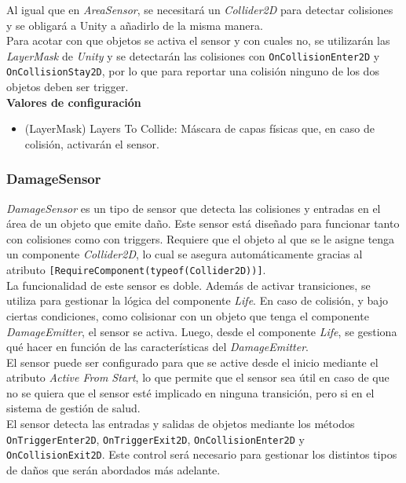 Al igual que en \textit{AreaSensor}, se necesitará un \textit{Collider2D} para detectar colisiones y se obligará a Unity a añadirlo de la misma manera.\\

Para acotar con que objetos se activa el sensor y con cuales no, se utilizarán las \textit{LayerMask} de \textit{Unity} y se detectarán las colisiones con \texttt{OnCollisionEnter2D} y \texttt{OnCollisionStay2D}, por lo que para reportar una colisión ninguno de los dos objetos deben ser trigger.\\

\textbf{Valores de configuración}
\begin{itemize}
	\item (LayerMask) Layers To Collide: Máscara de capas físicas que, en caso de colisión, activarán el sensor.
\end{itemize}

\subsubsection{DamageSensor}

\textit{DamageSensor} es un tipo de sensor que detecta las colisiones y entradas en el área de un objeto que emite daño. Este sensor está diseñado para funcionar tanto con colisiones como con triggers. Requiere que el objeto al que se le asigne tenga un componente \textit{Collider2D}, lo cual se asegura automáticamente gracias al atributo \texttt{[RequireComponent(typeof(Collider2D))]}.\\

La funcionalidad de este sensor es doble. Además de activar transiciones, se utiliza para gestionar la lógica del componente \textit{Life}. En caso de colisión, y bajo ciertas condiciones, como colisionar con un objeto que tenga el componente \textit{DamageEmitter}, el sensor se activa. Luego, desde el componente \textit{Life}, se gestiona qué hacer en función de las características del \textit{DamageEmitter}.\\

El sensor puede ser configurado para que se active desde el inicio mediante el atributo \textit{Active From Start}, lo que permite que el sensor sea útil en caso de que no se quiera que el sensor esté implicado en ninguna transición, pero si en el sistema de gestión de salud.\\

El sensor detecta las entradas y salidas de objetos mediante los métodos \texttt{OnTriggerEnter2D}, \texttt{OnTriggerExit2D}, \texttt{OnCollisionEnter2D} y \texttt{OnCollisionExit2D}. Este control será necesario para gestionar los distintos tipos de daños que serán abordados más adelante.\\

